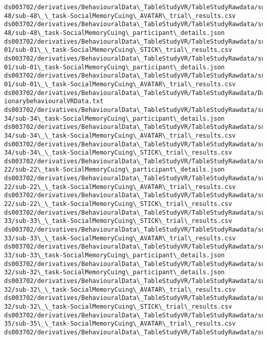 \documentclass[11pt]{article}
\begin{document}
\begin{Verbatim}[commandchars=\\\{\}]
ds003702/derivatives/BehaviouralData\_TableStudyVR/TableStudyRawdata/sub-
48/sub-48\_\_task-SocialMemoryCuing\_AVATAR\_trial\_results.csv
ds003702/derivatives/BehaviouralData\_TableStudyVR/TableStudyRawdata/sub-
48/sub-48\_task-SocialMemoryCuing\_participant\_details.json
ds003702/derivatives/BehaviouralData\_TableStudyVR/TableStudyRawdata/sub-
01/sub-01\_\_task-SocialMemoryCuing\_STICK\_trial\_results.csv
ds003702/derivatives/BehaviouralData\_TableStudyVR/TableStudyRawdata/sub-
01/sub-01\_task-SocialMemoryCuing\_participant\_details.json
ds003702/derivatives/BehaviouralData\_TableStudyVR/TableStudyRawdata/sub-
01/sub-01\_\_task-SocialMemoryCuing\_AVATAR\_trial\_results.csv
ds003702/derivatives/BehaviouralData\_TableStudyVR/TableStudyRawdata/DataDict
ionarybehaviouralVRData.txt
ds003702/derivatives/BehaviouralData\_TableStudyVR/TableStudyRawdata/sub-
34/sub-34\_task-SocialMemoryCuing\_participant\_details.json
ds003702/derivatives/BehaviouralData\_TableStudyVR/TableStudyRawdata/sub-
34/sub-34\_\_task-SocialMemoryCuing\_AVATAR\_trial\_results.csv
ds003702/derivatives/BehaviouralData\_TableStudyVR/TableStudyRawdata/sub-
34/sub-34\_\_task-SocialMemoryCuing\_STICK\_trial\_results.csv
ds003702/derivatives/BehaviouralData\_TableStudyVR/TableStudyRawdata/sub-
22/sub-22\_task-SocialMemoryCuing\_participant\_details.json
ds003702/derivatives/BehaviouralData\_TableStudyVR/TableStudyRawdata/sub-
22/sub-22\_\_task-SocialMemoryCuing\_AVATAR\_trial\_results.csv
ds003702/derivatives/BehaviouralData\_TableStudyVR/TableStudyRawdata/sub-
22/sub-22\_\_task-SocialMemoryCuing\_STICK\_trial\_results.csv
ds003702/derivatives/BehaviouralData\_TableStudyVR/TableStudyRawdata/sub-
33/sub-33\_\_task-SocialMemoryCuing\_STICK\_trial\_results.csv
ds003702/derivatives/BehaviouralData\_TableStudyVR/TableStudyRawdata/sub-
33/sub-33\_\_task-SocialMemoryCuing\_AVATAR\_trial\_results.csv
ds003702/derivatives/BehaviouralData\_TableStudyVR/TableStudyRawdata/sub-
33/sub-33\_task-SocialMemoryCuing\_participant\_details.json
ds003702/derivatives/BehaviouralData\_TableStudyVR/TableStudyRawdata/sub-
32/sub-32\_task-SocialMemoryCuing\_participant\_details.json
ds003702/derivatives/BehaviouralData\_TableStudyVR/TableStudyRawdata/sub-
32/sub-32\_\_task-SocialMemoryCuing\_AVATAR\_trial\_results.csv
ds003702/derivatives/BehaviouralData\_TableStudyVR/TableStudyRawdata/sub-
32/sub-32\_\_task-SocialMemoryCuing\_STICK\_trial\_results.csv
ds003702/derivatives/BehaviouralData\_TableStudyVR/TableStudyRawdata/sub-
35/sub-35\_\_task-SocialMemoryCuing\_AVATAR\_trial\_results.csv
ds003702/derivatives/BehaviouralData\_TableStudyVR/TableStudyRawdata/sub-

\end{Verbatim}
\end{document}

